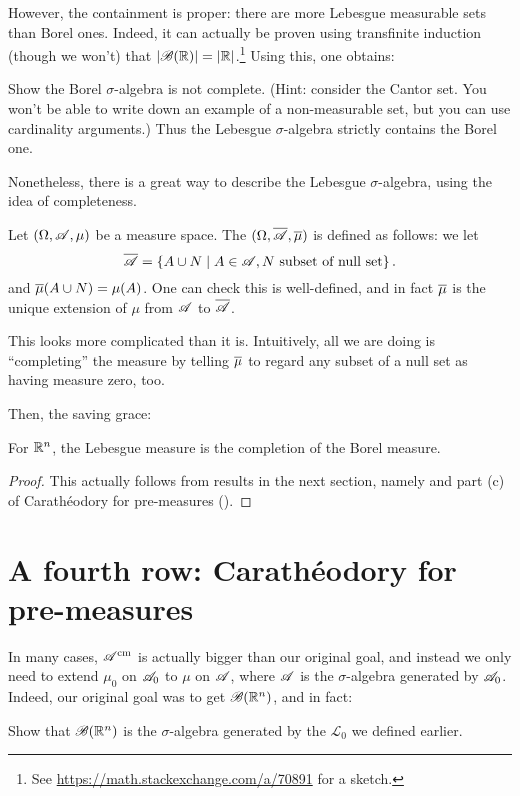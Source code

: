 However, the containment is proper:
there are more Lebesgue measurable sets than Borel ones.
Indeed, it can actually be proven using transfinite induction
(though we won't) that
$\left\lvert \mathscr B(\mathbb R) \right\rvert = \left\lvert \mathbb R \right\rvert$.\footnote{See
	\url{https://math.stackexchange.com/a/70891} for a sketch.}
Using this, one obtains:
\begin{exercise}
	Show the Borel $\sigma$-algebra is not complete.
	(Hint: consider the Cantor set.
	You won't be able to write down an example of a non-measurable
	set, but you can use cardinality arguments.)
	Thus the Lebesgue $\sigma$-algebra strictly contains the Borel one.
\end{exercise}

Nonetheless, there is a great way to describe the Lebesgue $\sigma$-algebra,
using the idea of completeness.
\begin{definition}
	Let $(\Omega, \mathscr A, \mu)$ be a measure space.
	The  $(\Omega, \overline{\mathscr A}, \overline{\mu})$
	is defined as follows:
	we let
	\[ \overline{\mathscr A} = \left\{ A \cup N \mid A \in \mathscr A,
		N \text{ subset of null set} \right\}. \]
	and $\overline{\mu}(A \cup N) = \mu(A)$.
	One can check this is well-defined,
	and in fact $\overline{\mu}$ is the unique extension
	of $\mu$ from $\mathscr A$ to $\overline{\mathscr A}$.

	This looks more complicated than it is.
	Intuitively, all we are doing is ``completing'' the measure
	by telling $\overline{\mu}$ to regard any subset of a null set
	as having measure zero, too.
\end{definition}

Then, the saving grace:
\begin{theorem}
	For $\mathbb R^n$, the Lebesgue measure is the completion of the Borel measure.
\end{theorem}
\begin{proof}
	This actually follows from results in the next section,
	namely 
	and part (c) of Carath\'{e}odory for pre-measures ().
\end{proof}

\section{A fourth row: Carath\'{e}odory for pre-measures}
In many cases, $\mathscr A^\text{cm}$ is actually bigger than our original goal,
and instead we only need to extend $\mu_0$ on $\mathscr A_0$
to $\mu$ on $\mathscr A$, where $\mathscr A$ is the $\sigma$-algebra generated by $\mathscr A_0$.
Indeed, our original goal was to get $\mathscr B(\mathbb R^n)$, and in fact:
\begin{exercise}
	\label{exer:cubes_vs_open}
	Show that $\mathscr B(\mathbb R^n)$ is the $\sigma$-algebra generated
	by the $\mathcal{L}_0$ we defined earlier.
\end{exercise}

